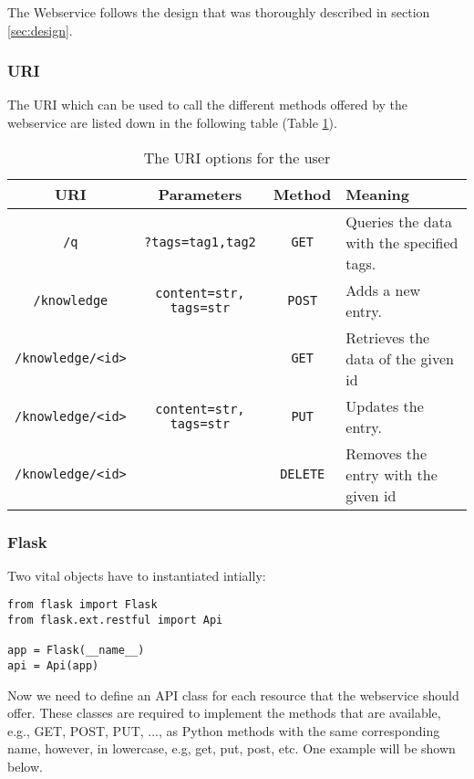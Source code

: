 \documentclass[11pt, a4paper]{article}
\begin{document}
The Webservice follows the design that was thoroughly described in section
\ref{sec:design}.

\subsubsection{URI}

The URI which can be used to call the different methods offered by the
webservice are listed down in the following table (Table \ref{tab:uri}).

\begin{table}[htbp]
  \centering
  \begin{tabular}{| c | c | c | l | } \hline
    \textbf{URI} & \textbf{Parameters} & \textbf{Method} & \textbf{Meaning} \\ \hline
    \lstinline|/q| & \lstinline|?tags=tag1,tag2| & \lstinline|GET| & Queries the data with the specified tags.  \\ \hline
    \lstinline|/knowledge| & \lstinline|content=str, tags=str| & \lstinline|POST| & Adds a new entry. \\ \hline
    \lstinline|/knowledge/<id>| &  & \lstinline|GET| & Retrieves the data of the given id  \\ \hline
    \lstinline|/knowledge/<id>| & \lstinline|content=str, tags=str| & \lstinline|PUT| & Updates the entry.   \\ \hline
    \lstinline|/knowledge/<id>| &  & \lstinline|DELETE| & Removes the entry with the given id \\ \hline
  \end{tabular}
  \caption{The URI options for the user}
  \label{tab:uri}
\end{table}

\subsubsection{Flask}

Two vital objects have to instantiated intially: 

\begin{lstlisting}
from flask import Flask
from flask.ext.restful import Api

app = Flask(__name__)
api = Api(app)
\end{lstlisting}
\vspace{10pt}

Now we need to define an API class for each resource that the webservice should
offer. These classes are required to implement the methods that are available,
e.g., GET, POST, PUT, ..., as Python methods with the same corresponding name,
however, in lowercase, e.g, get, put, post, etc. One example will be shown
below. 
\end{document}
